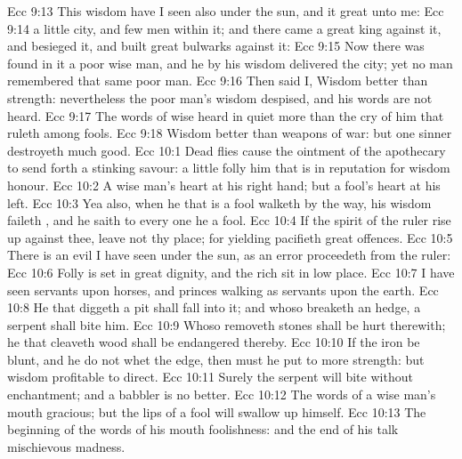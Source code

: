 \vs Ecc 9:13 This wisdom have I seen also under the sun, and it  great unto me:
\vs Ecc 9:14  a little city, and few men within it; and there came a great king against it, and besieged it, and built great bulwarks against it:
\vs Ecc 9:15 Now there was found in it a poor wise man, and he by his wisdom delivered the city; yet no man remembered that same poor man.
\vs Ecc 9:16 Then said I, Wisdom  better than strength: nevertheless the poor man's wisdom  despised, and his words are not heard.
\vs Ecc 9:17 The words of wise  heard in quiet more than the cry of him that ruleth among fools.
\vs Ecc 9:18 Wisdom  better than weapons of war: but one sinner destroyeth much good.
\vs Ecc 10:1 Dead flies cause the ointment of the apothecary to send forth a stinking savour:  a little folly him that is in reputation for wisdom  honour.
\vs Ecc 10:2 A wise man's heart  at his right hand; but a fool's heart at his left.
\vs Ecc 10:3 Yea also, when he that is a fool walketh by the way, his wisdom faileth , and he saith to every one  he  a fool.
\vs Ecc 10:4 If the spirit of the ruler rise up against thee, leave not thy place; for yielding pacifieth great offences.
\vs Ecc 10:5 There is an evil  I have seen under the sun, as an error  proceedeth from the ruler:
\vs Ecc 10:6 Folly is set in great dignity, and the rich sit in low place.
\vs Ecc 10:7 I have seen servants upon horses, and princes walking as servants upon the earth.
\vs Ecc 10:8 He that diggeth a pit shall fall into it; and whoso breaketh an hedge, a serpent shall bite him.
\vs Ecc 10:9 Whoso removeth stones shall be hurt therewith;  he that cleaveth wood shall be endangered thereby.
\vs Ecc 10:10 If the iron be blunt, and he do not whet the edge, then must he put to more strength: but wisdom  profitable to direct.
\vs Ecc 10:11 Surely the serpent will bite without enchantment; and a babbler is no better.
\vs Ecc 10:12 The words of a wise man's mouth  gracious; but the lips of a fool will swallow up himself.
\vs Ecc 10:13 The beginning of the words of his mouth  foolishness: and the end of his talk  mischievous madness.
